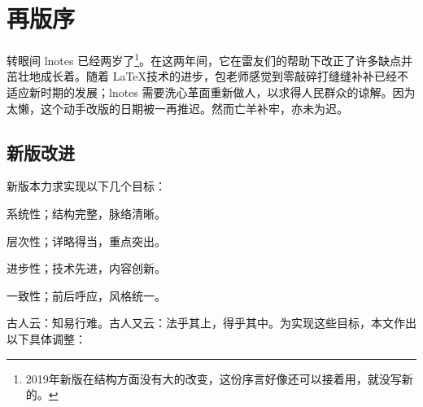 \chapter{再版序}

转眼间 lnotes 已经两岁了\footnote{2019年新版在结构方面没有大的改变，这份序言好像还可以接着用，就没写新的。}。在这两年间，它在雷友们的帮助下改正了许多缺点并茁壮地成长着。随着 \LaTeX 技术的进步，包老师感觉到零敲碎打缝缝补补已经不适应新时期的发展；lnotes 需要洗心革面重新做人，以求得人民群众的谅解。因为太懒，这个动手改版的日期被一再推迟。然而亡羊补牢，亦未为迟。

\section*{新版改进}
新版本力求实现以下几个目标：

\begin{compactenum}
  \item 系统性；结构完整，脉络清晰。
  \item 层次性；详略得当，重点突出。
  \item 进步性；技术先进，内容创新。
  \item 一致性；前后呼应，风格统一。
\end{compactenum}

古人云：知易行难。古人又云：法乎其上，得乎其中。为实现这些目标，本文作出以下具体调整：

